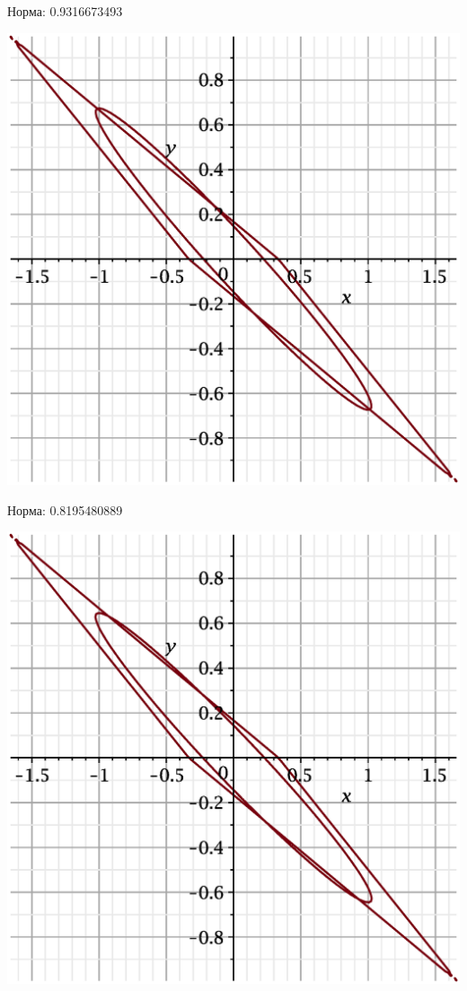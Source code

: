 \documentclass{beamer}
\begin{document}
\begin{frame}
Норма: 0.9316673493
    \begin{center}
        \includegraphics[scale=0.4]{pictures/8.eps}
    \end{center}
\end{frame}

\begin{frame}
Норма: 0.8195480889
    \begin{center}
        \includegraphics[scale=0.4]{pictures/9.eps}
    \end{center}
\end{frame}
\end{document}
